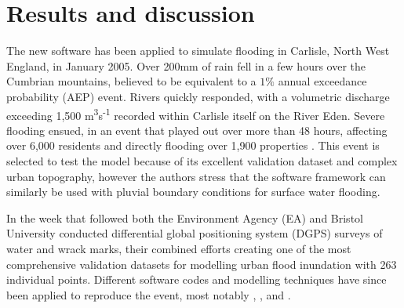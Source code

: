\documentclass[11pt,english,a4paper]{article}
\begin{document}
\section{Results and discussion}

The new software has been applied to simulate flooding in Carlisle, North West England, in January 2005. Over 200mm of rain fell in a few hours over the Cumbrian mountains, believed to be equivalent to a \(1\%\) annual exceedance probability (AEP) event. Rivers quickly responded, with a volumetric discharge exceeding 1,500 m\textsuperscript{3}s\textsuperscript{-1} recorded within Carlisle itself on the River Eden. Severe flooding ensued, in an event that played out over more than 48 hours, affecting over 6,000 residents and directly flooding over 1,900 properties \citep{GONW2005,EnvironmentAgency2006a}. This event is selected to test the model because of its excellent validation dataset and complex urban topography, however the authors stress that the software framework can similarly be used with pluvial boundary conditions for surface water flooding. 

In the week that followed both the Environment Agency (EA) and Bristol University conducted differential global positioning system (DGPS) surveys of water and wrack marks, their combined efforts creating one of the most comprehensive validation datasets for modelling urban flood inundation with 263 individual points. Different software codes and modelling techniques have since been applied to reproduce the event, most notably \citet{Neal2009}, \citet{Horritt2010}, \citet{Fewtrell2011a} and \citet{Liu2013}. 
\end{document}
